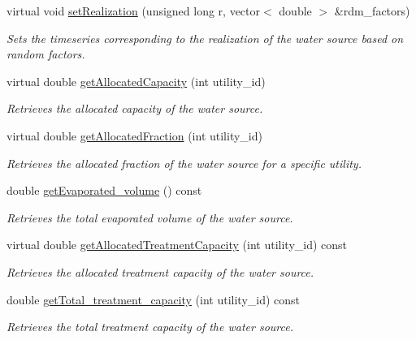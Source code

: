 \begin{DoxyCompactItemize}
virtual void \mbox{\hyperlink{classWaterSource_a634904c510b16de6d7c057fed6d6e625}{set\+Realization}} (unsigned long r, vector$<$ double $>$ \&rdm\+\_\+factors)
\begin{DoxyCompactList}\small\item\em Sets the timeseries corresponding to the realization of the water source based on random factors. \end{DoxyCompactList}\item 
virtual double \mbox{\hyperlink{classWaterSource_ad218f2a603d7ebce268d800e0249a74c}{get\+Allocated\+Capacity}} (int utility\+\_\+id)
\begin{DoxyCompactList}\small\item\em Retrieves the allocated capacity of the water source. \end{DoxyCompactList}\item 
virtual double \mbox{\hyperlink{classWaterSource_acec9b1fef81a9b73c4517409438452ac}{get\+Allocated\+Fraction}} (int utility\+\_\+id)
\begin{DoxyCompactList}\small\item\em Retrieves the allocated fraction of the water source for a specific utility. \end{DoxyCompactList}\item 
double \mbox{\hyperlink{classWaterSource_a00b156a153fc24097e4c8a4e5c46c4e0}{get\+Evaporated\+\_\+volume}} () const
\begin{DoxyCompactList}\small\item\em Retrieves the total evaporated volume of the water source. \end{DoxyCompactList}\item 
virtual double \mbox{\hyperlink{classWaterSource_ab98528c4d2e6ecd14cb2c813b1d445c6}{get\+Allocated\+Treatment\+Capacity}} (int utility\+\_\+id) const
\begin{DoxyCompactList}\small\item\em Retrieves the allocated treatment capacity of the water source. \end{DoxyCompactList}\item 
double \mbox{\hyperlink{classWaterSource_a6228c9aee407ca2544753dbd2792c5fb}{get\+Total\+\_\+treatment\+\_\+capacity}} (int utility\+\_\+id) const
\begin{DoxyCompactList}\small\item\em Retrieves the total treatment capacity of the water source. \end{DoxyCompactList}\item 

\end{DoxyCompactItemize}
